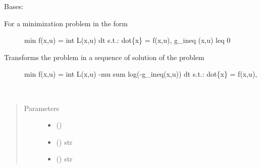 \documentclass[letterpaper,10pt,english]{sphinxmanual}
\begin{document}
\begin{fulllineitems}
\label{\detokenize{yaocptool.methods:yaocptool.methods.augmented_lagrangian.AugmentedLagrangian}}
Bases: {\hyperref[\detokenize{yaocptool.methods.base:yaocptool.methods.base.solutionmethodsbase.SolutionMethodsBase}]{}}
\begin{description}
\item[{For a minimization problem in the form}] \leavevmode
min f(x,u) = int L(x,u) dt
s.t.: dot\{x\} = f(x,u),
g\_ineq (x,u) leq 0

\item[{Transforms the problem in a sequence of solution of the problem}] \leavevmode
min f(x,u) = int L(x,u) -mu sum log(-g\_ineq(x,u)) dt
s.t.: dot\{x\} = f(x,u),

\end{description}

\begin{fulllineitems}
\label{\detokenize{yaocptool.methods:yaocptool.methods.augmented_lagrangian.AugmentedLagrangian.__init__}}~\begin{quote}\begin{description}
\item[{Parameters}] \leavevmode\begin{itemize}
\item {} 
 ({\hyperref[\detokenize{yaocptool.modelling:yaocptool.modelling.ocp.OptimalControlProblem}]{}}) \textendash{} 

\item {} 
 () \textendash{} str

\item {} 
 () \textendash{} str


\end{itemize}
\end{description}
\end{quote}
\end{fulllineitems}
\end{fulllineitems}
\end{document}
